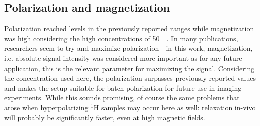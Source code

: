         \subsection{Polarization and magnetization}
            Polarization reached levels in the previously reported ranges while magnetization was high considering the high concentrations of \SI{50}{\milli\molar}. In many publications, researchers seem to try and maximize polarization - in this work, magnetization, i.e. absolute signal intensity was considered more important as for any future application, this is the relevant parameter for maximizing the signal. Considering the concentration used here, the polarization surpasses previously reported values and makes the setup suitable for batch polarization for future use in imaging experiments. While this sounds promising, of course the same problems that arose when hyperpolarizing $^{1}$H samples may occur here as well: relaxation in-vivo will probably be significantly faster, even at high magnetic fields.
